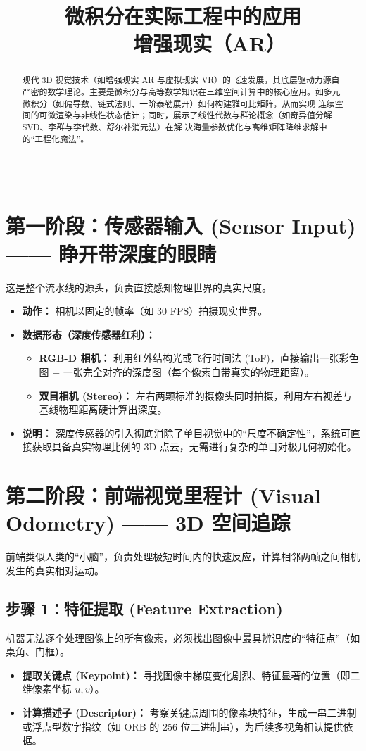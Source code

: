 \documentclass[12pt,a4paper]{article}
\title{\textbf{微积分在实际工程中的应用\\ —— 增强现实（AR）}}
\date{}
\begin{document}
\maketitle

\begin{abstract}
现代 3D 视觉技术（如增强现实 AR 与虚拟现实 VR）的飞速发展，其底层驱动力源自严密的数学理论。主要是微积分与高等数学知识在三维空间计算中的核心应用。如多元微积分（如偏导数、链式法则、一阶泰勒展开）如何构建雅可比矩阵，从而实现
连续空间的可微渲染与非线性状态估计；同时，展示了线性代数与群论概念（如奇异值分解 SVD、李群与李代数、舒尔补消元法）在解
决海量参数优化与高维矩阵降维求解中的“工程化魔法”。
\end{abstract}

\vspace{0.5cm}
\hrule
\vspace{0.5cm}

\section{第一阶段：传感器输入 (Sensor Input) —— 睁开带深度的眼睛}
这是整个流水线的源头，负责直接感知物理世界的真实尺度。
\begin{itemize}
    \item \textbf{动作：} 相机以固定的帧率（如 30 FPS）拍摄现实世界。
    \item \textbf{数据形态（深度传感器红利）：} 
    \begin{itemize}
        \item \textbf{RGB-D 相机：} 利用红外结构光或飞行时间法 (ToF)，直接输出一张彩色图 + 一张完全对齐的深度图（每个像素自带真实的物理距离）。
        \item \textbf{双目相机 (Stereo)：} 左右两颗标准的摄像头同时拍摄，利用左右视差与基线物理距离硬计算出深度。
    \end{itemize}
    \item \textbf{说明：} 深度传感器的引入彻底消除了单目视觉中的“尺度不确定性”，系统可直接获取具备真实物理比例的 3D 点云，无需进行复杂的单目对极几何初始化。
\end{itemize}

\section{第二阶段：前端视觉里程计 (Visual Odometry) —— 3D 空间追踪}
前端类似人类的“小脑”，负责处理极短时间内的快速反应，计算相邻两帧之间相机发生的真实相对运动。

\subsection{步骤 1：特征提取 (Feature Extraction)}
机器无法逐个处理图像上的所有像素，必须找出图像中最具辨识度的“特征点”（如桌角、门框）。
\begin{itemize}
    \item \textbf{提取关键点 (Keypoint)：} 寻找图像中梯度变化剧烈、特征显著的位置（即二维像素坐标 $u, v$）。
    \item \textbf{计算描述子 (Descriptor)：} 考察关键点周围的像素块特征，生成一串二进制或浮点型数字指纹（如 ORB 的 256 位二进制串），为后续多视角相认提供依据。
\end{itemize}
\end{document}
